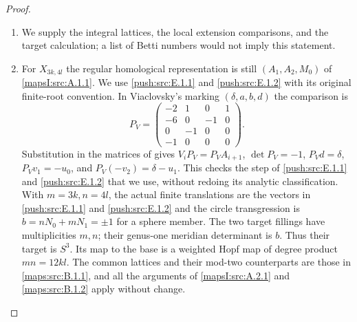 \begin{proof}
\begin{enumerate}[label=\arabic*.,leftmargin=*]
\item We supply the integral lattices, the local extension
comparisons, and the target calculation; a list of
Betti numbers would not imply this statement.

\item For $X_{3k,4l}$ the regular homological representation
is still $(A_1,A_2,M_0)$ of \cref{mapsI:src:A.1.1}.  We use \cref{push:src:E.1.1} and \cref{push:src:E.1.2} with
its original finite-root convention.  In Viaclovsky's
marking $(\delta,a,b,d)$ the comparison is
\[
 P_V=\begin{pmatrix}-2&1&0&1\\-6&0&-1&0\\0&-1&0&0\\-1&0&0&0\end{pmatrix}.
\]
Substitution in the matrices of
\cite[Lemma 2.1 and equations (2.11)--(2.12)]{mapsViaLog}
gives $V_iP_V=P_VA_{i+1}$, $\det P_V=-1$,
$P_Vd=\delta$, $P_Vv_1=-u_0$, and
$P_V(-v_2)=\delta-u_1$.  This checks the step of
\cref{push:src:E.1.1} and \cref{push:src:E.1.2} that we use, without redoing its analytic
classification.  With $m=3k,n=4l$, the actual
finite translations are the vectors in \cref{push:src:E.1.1} and \cref{push:src:E.1.2} and
the circle transgression is
$b=nN_0+mN_1=\pm1$ for a sphere member.
The two target fillings have multiplicities $m,n$;
their genus-one meridian determinant is $b$.
Thus their target is $S^3$.  Its map to the base
is a weighted Hopf map of degree product $mn=12kl$.
The common lattices and their mod-two counterparts
are those in \ref{maps:src:B.1.1}, and all the arguments of
\cref{mapsI:src:A.2.1} and \ref{maps:src:B.1.2} apply without change.


\end{enumerate}
\end{proof}
